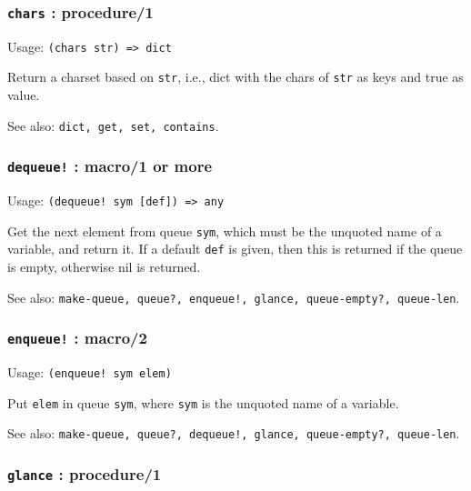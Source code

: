 \documentclass[
]{article}
\newcommand{\passthrough}[1]{#1}
\begin{document}
\hypertarget{chars-procedure1}{%
\subsubsection{\texorpdfstring{\texttt{chars} :
procedure/1}{chars : procedure/1}}\label{chars-procedure1}}

Usage: \passthrough{\lstinline!(chars str) => dict!}

Return a charset based on \passthrough{\lstinline!str!}, i.e., dict with
the chars of \passthrough{\lstinline!str!} as keys and true as value.

See also: \passthrough{\lstinline!dict, get, set, contains!}.

\hypertarget{dequeue-macro1-or-more}{%
\subsubsection{\texorpdfstring{\texttt{dequeue!} : macro/1 or
more}{dequeue! : macro/1 or more}}\label{dequeue-macro1-or-more}}

Usage: \passthrough{\lstinline"(dequeue! sym [def]) => any"}

Get the next element from queue \passthrough{\lstinline!sym!}, which
must be the unquoted name of a variable, and return it. If a default
\passthrough{\lstinline!def!} is given, then this is returned if the
queue is empty, otherwise nil is returned.

See also:
\passthrough{\lstinline"make-queue, queue?, enqueue!, glance, queue-empty?, queue-len"}.

\hypertarget{enqueue-macro2}{%
\subsubsection{\texorpdfstring{\texttt{enqueue!} :
macro/2}{enqueue! : macro/2}}\label{enqueue-macro2}}

Usage: \passthrough{\lstinline"(enqueue! sym elem)"}

Put \passthrough{\lstinline!elem!} in queue
\passthrough{\lstinline!sym!}, where \passthrough{\lstinline!sym!} is
the unquoted name of a variable.

See also:
\passthrough{\lstinline"make-queue, queue?, dequeue!, glance, queue-empty?, queue-len"}.

\hypertarget{glance-procedure1}{%
\subsubsection{\texorpdfstring{\texttt{glance} :
procedure/1}{glance : procedure/1}}\label{glance-procedure1}}
\end{document}
